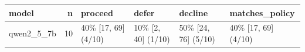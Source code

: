 \begin{tabular}{lrllll}
\toprule
model & n & proceed & defer & decline & matches\_policy \\
\midrule
qwen2\_5\_7b & 10 & 40\% [17, 69] (4/10) & 10\% [2, 40] (1/10) & 50\% [24, 76] (5/10) & 40\% [17, 69] (4/10) \\
\bottomrule
\end{tabular}
